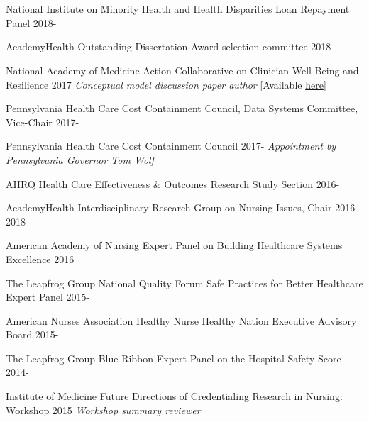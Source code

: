 \documentclass[10pt,]{article}
\begin{document}
{{{{{{{{{{{{{{{\begin{hangparas}{.5in}{1}
\end{hangparas}

\section{\Large {}}

National Institute on Minority Health and Health Disparities Loan Repayment Panel \hfill {2018-{\small{}}} 

AcademyHealth Outstanding Dissertation Award selection committee \hfill {2018-{\small{}}}

National Academy of Medicine Action Collaborative on Clinician Well-Being and Resilience  \hfill {2017} \newline
\hspace*{0.5 cm} {\textit {Conceptual model discussion paper author}} [Available \href{https://nam.edu/journey-construct-encompassing-conceptual-model-factors-affecting-clinician-well-resilience/}{\ttfamily here}]

Pennsylvania Health Care Cost Containment Council, Data Systems Committee, Vice-Chair \hfill {2017-{\small{}}} 

Pennsylvania Health Care Cost Containment Council \hfill {2017-{\small{}}} \newline
\hspace*{0.5 cm} {\textit {Appointment by Pennsylvania Governor Tom Wolf }}

AHRQ Health Care Effectiveness \& Outcomes Research Study Section \hfill {2016-{\small{}}}

AcademyHealth Interdisciplinary Research Group on Nursing Issues, Chair \hfill 2016-2018

American Academy of Nursing Expert Panel on Building Healthcare Systems Excellence \hfill 2016

The Leapfrog Group National Quality Forum Safe Practices for Better Healthcare Expert Panel  \hfill {2015-{\small{}}}	

American Nurses Association Healthy Nurse Healthy Nation Executive Advisory Board  \hfill {2015-{\small{}}}	

The Leapfrog Group Blue Ribbon Expert Panel on the Hospital Safety Score  \hfill {2014-{\small{}}}	

Institute of Medicine Future Directions of Credentialing Research in Nursing: Workshop \hfill 2015 \newline
\hspace*{0.5 cm} {\textit {Workshop summary reviewer}}

}}}}}}}}}}}}}}}
\end{document}
